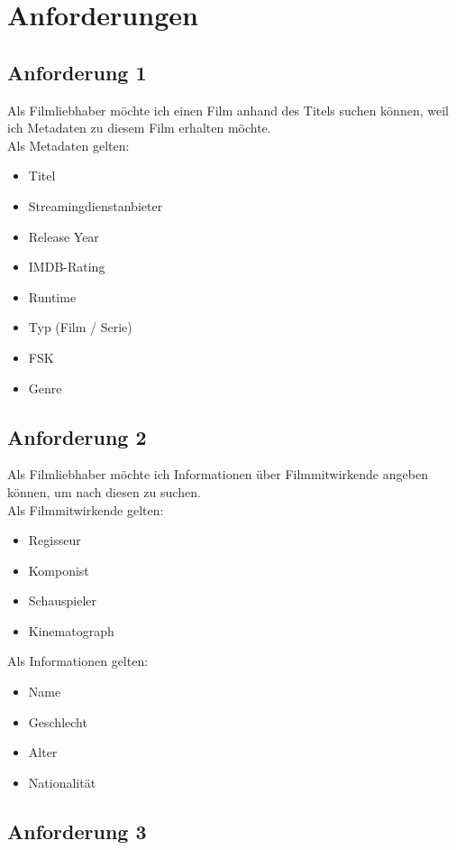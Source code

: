 \documentclass[conference]{IEEEtran}
\begin{document}
\section{Anforderungen}

\subsection{Anforderung 1}
\label{1}
Als Filmliebhaber möchte ich einen Film anhand des Titels suchen können,
weil ich Metadaten zu diesem Film erhalten möchte.
\\
Als Metadaten gelten:
\begin{itemize}
	\item Titel
	\item Streamingdienstanbieter
	\item Release Year
	\item IMDB-Rating
	\item Runtime
	\item Typ (Film / Serie)
	\item FSK
	\item Genre
\end{itemize}


\subsection{Anforderung 2}
\label{2}
Als Filmliebhaber möchte ich Informationen über Filmmitwirkende angeben können,
um nach diesen zu suchen.
\\
Als Filmmitwirkende gelten:

\begin{itemize}
	\item Regisseur
	\item Komponist
	\item Schauspieler
	\item Kinematograph
\end{itemize}

Als Informationen gelten:

\begin{itemize}
	\item Name
	\item Geschlecht
	\item Alter
	\item Nationalität
\end{itemize}

\subsection{Anforderung 3}
\end{document}
